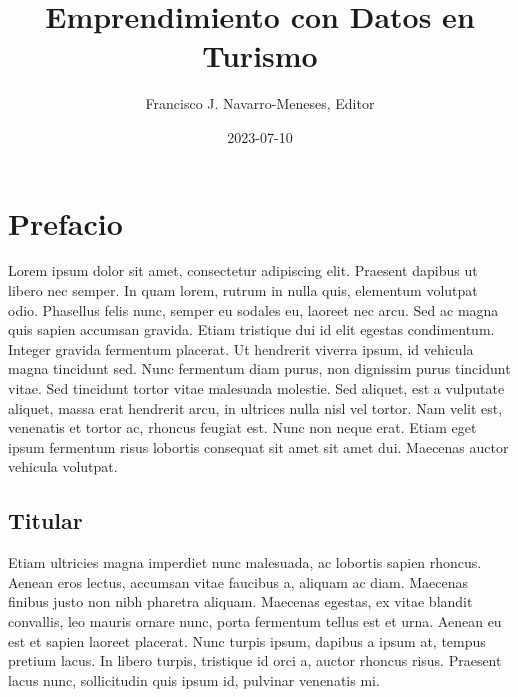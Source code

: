 \documentclass[
  letterpaper,
  DIV=11,
  numbers=noendperiod]{scrreprt}
\title{Emprendimiento con Datos en Turismo}
\author{Francisco J. Navarro-Meneses, Editor}
\date{2023-07-10}
\renewcommand*\contentsname{Table of contents}
\newcommand\contentsname{Table of contents}
\begin{document}
\maketitle
\ifdefined\Shaded\renewenvironment{Shaded}{\begin{tcolorbox}[interior hidden, enhanced, sharp corners, boxrule=0pt, borderline west={3pt}{0pt}{shadecolor}, breakable, frame hidden]}{\end{tcolorbox}}\fi

\renewcommand*\contentsname{Table of contents}
{
\hypersetup{linkcolor=}
\setcounter{tocdepth}{2}
\tableofcontents
}

\hypertarget{prefacio}{%
\chapter*{Prefacio}\label{prefacio}}


Lorem ipsum dolor sit amet, consectetur adipiscing elit. Praesent
dapibus ut libero nec semper. In quam lorem, rutrum in nulla quis,
elementum volutpat odio. Phasellus felis nunc, semper eu sodales eu,
laoreet nec arcu. Sed ac magna quis sapien accumsan gravida. Etiam
tristique dui id elit egestas condimentum. Integer gravida fermentum
placerat. Ut hendrerit viverra ipsum, id vehicula magna tincidunt sed.
Nunc fermentum diam purus, non dignissim purus tincidunt vitae. Sed
tincidunt tortor vitae malesuada molestie. Sed aliquet, est a vulputate
aliquet, massa erat hendrerit arcu, in ultrices nulla nisl vel tortor.
Nam velit est, venenatis et tortor ac, rhoncus feugiat est. Nunc non
neque erat. Etiam eget ipsum fermentum risus lobortis consequat sit amet
sit amet dui. Maecenas auctor vehicula volutpat.

\hypertarget{titular}{%
\section*{Titular}\label{titular}}


Etiam ultricies magna imperdiet nunc malesuada, ac lobortis sapien
rhoncus. Aenean eros lectus, accumsan vitae faucibus a, aliquam ac diam.
Maecenas finibus justo non nibh pharetra aliquam. Maecenas egestas, ex
vitae blandit convallis, leo mauris ornare nunc, porta fermentum tellus
est et urna. Aenean eu est et sapien laoreet placerat. Nunc turpis
ipsum, dapibus a ipsum at, tempus pretium lacus. In libero turpis,
tristique id orci a, auctor rhoncus risus. Praesent lacus nunc,
sollicitudin quis ipsum id, pulvinar venenatis mi.
\end{document}
